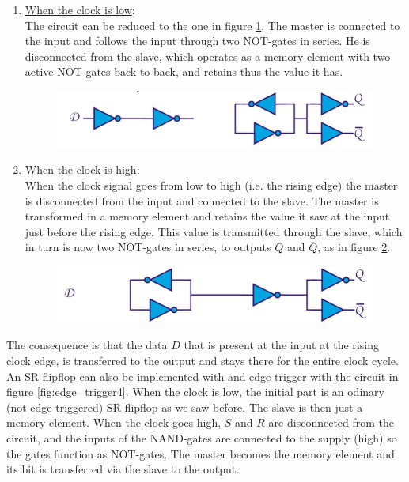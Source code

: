 \begin{enumerate}
	\item \underline{When the clock is low}:\\
	The circuit can be reduced to the one in figure \ref{fig:edge_trigger2}. The master is connected to the input and follows the input through two NOT-gates in series. He is disconnected from the slave, which operates as a memory element with two active NOT-gates back-to-back, and retains thus the value it has.
	\begin{figure}[h!]
		\centering
		\includegraphics[width=12cm]{figures/ch17/edge_trigger2.jpg}
		\caption{}
		\label{fig:edge_trigger2}		
	\end{figure}

	\item \underline{When the clock is high}:\\
	When the clock signal goes from low to high (i.e. the rising edge) the master is disconnected from the input and connected to the slave. The master is transformed in a memory element and retains the value it saw at the input just before the rising edge. This value is transmitted through the slave, which in turn is now two NOT-gates in series, to outputs $Q$ and $\overline{Q}$, as in figure \ref{fig:edge_trigger3}.
	\begin{figure}[h!]
		\centering
		\includegraphics[width=12cm]{figures/ch17/edge_trigger3.jpg}
		\caption{}
		\label{fig:edge_trigger3}		
	\end{figure}
\end{enumerate}
The consequence is that the data $D$ that is present at the input at the rising clock edge, is transferred to the output and stays there for the entire clock cycle.\\
An SR flipflop can also be implemented with and edge trigger with the circuit in figure \ref{fig:edge_trigger4}. When the clock is low, the initial part is an odinary (not edge-triggered) SR flipflop as we saw before. The slave is then just a memory element. When the clock goes high, $S$ and $R$ are disconnected from the circuit, and the inputs of the NAND-gates are connected to the supply (high) so the gates function as NOT-gates. The master becomes the memory element and its bit is transferred via the slave to the output.

